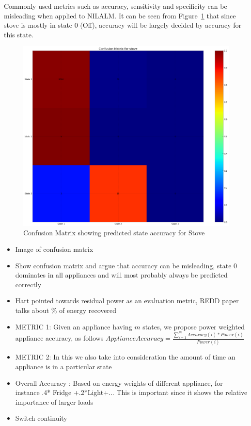 \documentclass[conference]{IEEEtran}
\newcommand{\figref}[1]{Figure~\ref{#1}}
\begin{document}
Commonly used metrics such as accuracy, sensitivity and specificity can be misleading when applied to NILALM. It can be seen from \figref{fig:confusion} that since stove is mostly in state 0 (Off), accuracy will be largely decided by accuracy for this state.
\begin{figure}
\centering \includegraphics[scale=0.1]{./figures/confusion_stove.png}
\caption{Confusion Matrix showing predicted state accuracy for Stove}
   \label{fig:confusion}
\end{figure}

    \begin{itemize}
\item Image of confusion matrix
\item Show confusion matrix and argue that accuracy can be misleading, state 0 dominates in all appliances and will most probably always be predicted correctly
\item Hart pointed towards residual power as an evaluation metric, REDD paper talks about \% of energy recovered
\item METRIC 1: Given an appliance having $m$ states, we propose power weighted appliance accuracy, as follows
$Appliance Accuracy = \frac{\sum\limits_{i=1}^{m} Accuracy(i)*Power(i)}{Power(i)} $
\item METRIC 2: In this we also take into consideration the amount of time an appliance is in a particular state
\item Overall Accuracy : Based on energy weights of different appliance, for instance .4* Fridge +.2*Light+...
This is important since it shows the relative importance of larger loads 
\item Switch continuity
\end{itemize}
\end{document}
